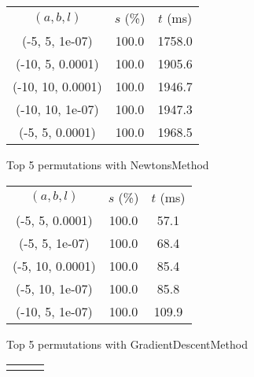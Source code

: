 \begin{figure}[H]
\label{fig:param_comp_NegativeEntropy_GoldenSectionSearch}
\begin{subfigure}[ht]{.5\textwidth}
\begin{tabular}{|c|c|c|}
\hline
\rowcolor{gray!25}
\multicolumn{3}{|c|}{NewtonsMethod} \\
\hline
\rowcolor{gray!25}
$(a,b,l)$ & $s$ (\%) & $t$ (ms) \\
\hline
(-5, 5, 1e-07) & 100.0 & 1758.0 \\
(-10, 5, 0.0001) & 100.0 & 1905.6 \\
(-10, 10, 0.0001) & 100.0 & 1946.7 \\
(-10, 10, 1e-07) & 100.0 & 1947.3 \\
(-5, 5, 0.0001) & 100.0 & 1968.5 \\
\hline
\end{tabular}
\caption{Top 5 permutations with NewtonsMethod}
\label{subfig:param_comp_NegativeEntropy_NewtonsMethod_GoldenSectionSearch}
\end{subfigure}
\hfill
\begin{subfigure}[ht]{.5\textwidth}
\begin{tabular}{|c|c|c|}
\hline
\rowcolor{gray!25}
\multicolumn{3}{|c|}{GradientDescentMethod} \\
\hline
\rowcolor{gray!25}
$(a,b,l)$ & $s$ (\%) & $t$ (ms) \\
\hline
(-5, 5, 0.0001) & 100.0 & 57.1 \\
(-5, 5, 1e-07) & 100.0 & 68.4 \\
(-5, 10, 0.0001) & 100.0 & 85.4 \\
(-5, 10, 1e-07) & 100.0 & 85.8 \\
(-10, 5, 1e-07) & 100.0 & 109.9 \\
\hline
\end{tabular}
\caption{Top 5 permutations with GradientDescentMethod}
\label{subfig:param_comp_NegativeEntropy_GradientDescentMethod_GoldenSectionSearch}
\end{subfigure}
\hfill
\begin{subfigure}[ht]{.5\textwidth}
\begin{tabular}{|c|c|c|}
\hline
\rowcolor{gray!25}
\multicolumn{3}{|c|}{ConjugateGradientMethod} \\

\end{tabular}
\end{subfigure}
\end{figure}
